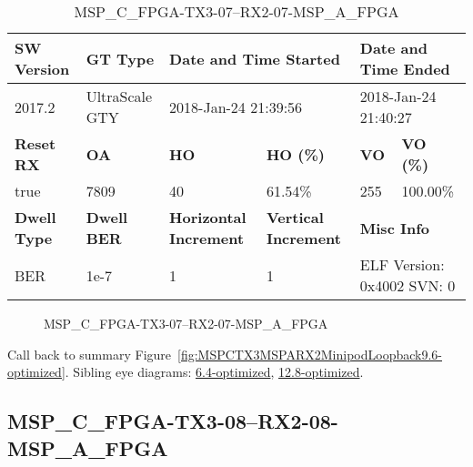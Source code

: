 \begin{table}[h]
\centering
\caption{MSP\_C\_FPGA-TX3-07--RX2-07-MSP\_A\_FPGA}
\label{tab:MSPCFPGATX307RX207MSPAFPGA9.6-optimized}
\begin{tabular}{@{}|l|l|l|l|l|l|@{}}
\toprule
\textbf{SW Version}                & \textbf{GT Type}   & \multicolumn{2}{l|}{\textbf{Date and Time Started}}            & \multicolumn{2}{l|}{\textbf{Date and Time Ended}}        \\ \midrule
2017.2                       & UltraScale GTY          & \multicolumn{2}{l|}{2018-Jan-24 21:39:56}                   & \multicolumn{2}{l|}{2018-Jan-24 21:40:27}               \\ \midrule
\textbf{Reset RX}                  & \textbf{OA} & \textbf{HO}   & \textbf{HO (\%)} & \textbf{VO} & \textbf{VO (\%)} \\ \midrule
true & 7809        & 40          & 61.54\%        & 255        & 100.00\%       \\ \midrule
\textbf{Dwell Type}                & \textbf{Dwell BER} & \textbf{Horizontal Increment} & \textbf{Vertical Increment}    & \multicolumn{2}{l|}{\textbf{Misc Info}}                  \\ \midrule
BER                            & 1e-7        & 1        & 1           & \multicolumn{2}{l|}{ELF Version: 0x4002 SVN: 0}                         \\ \bottomrule
\end{tabular}
\end{table}

\begin{figure}[h]
\caption{MSP\_C\_FPGA-TX3-07--RX2-07-MSP\_A\_FPGA} \label{fig:MSPCFPGATX307RX207MSPAFPGA9.6-optimized}
\end{figure}

Call back to summary Figure~\ref{fig:MSPCTX3MSPARX2MinipodLoopback9.6-optimized}.
Sibling eye diagrams: \hyperref[sec:MSPCFPGATX307RX207MSPAFPGA6.4-optimized]{6.4-optimized}, \hyperref[sec:MSPCFPGATX307RX207MSPAFPGA12.8-optimized]{12.8-optimized}.

\clearpage
\newpage


\subsection{MSP\_C\_FPGA-TX3-08--RX2-08-MSP\_A\_FPGA}\label{sec:MSPCFPGATX308RX208MSPAFPGA9.6-optimized}

